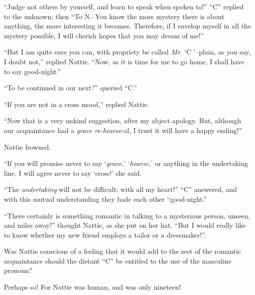 ``Judge not others by yourself, and learn to speak when spoken to!'' ``C''
replied to the unknown; then ``To N.--You know the more mystery there is
about anything, the more interesting it becomes. Therefore, if I envelop
myself in all the mystery possible, I will cherish hopes that you may
dream of me!''

``But I am quite sure you can, with propriety be called \emph{Mr.} `C '--plain,
as you say, I doubt not,'' replied Nattie. ``Now, as it is time for me to
go home, I shall have to say good-night.''

``To be continued in our next?'' queried ``C.''

``If you are not in a cross mood,'' replied Nattie.

``Now that is a very unkind suggestion, after my abject apology. But,
although our acquaintance had a \emph{grave re-hearse}-al, I trust it will have
a happy ending!''

Nattie frowned.

``If you will promise never to say `\emph{grave},' `\emph{hearse,}' or anything in the
undertaking line, I will agree never to say `cross!' she said.

``The \emph{undertaking} will not be difficult; with all my heart!'' ``C''
answered, and with this mutual understanding they bade each other
``good-night.''

``There certainly is something romantic in talking to a mysterious
person, unseen, and miles away!'' thought Nattie, as she put on her hat.
``But I would really like to know whether my new friend employs a tailor
or a dressmaker!''.

Was Nattie conscious of a feeling that it would add to the zest of the
romantic acquaintance should the distant ``C'' be entitled to the use of
the masculine pronoun?

Perhaps so! For Nattie was human, and was only nineteen!






